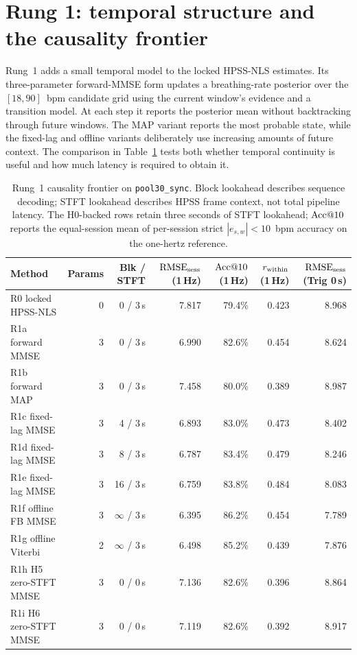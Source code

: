 \section{Rung 1: temporal structure and the causality frontier}
\label{sec:ch4_rung1}

Rung~1 adds a small temporal model to the locked HPSS-NLS estimates. Its three-parameter
forward-MMSE form updates a breathing-rate posterior over the $[18,90]$~bpm candidate grid using the current
window's evidence and a transition model. At each step it reports the posterior mean without
backtracking through future windows. The MAP variant reports the most probable state, while the
fixed-lag and offline variants deliberately use increasing amounts of future context. The
comparison in Table~\ref{tab:ch4_rung1} tests both whether temporal continuity is useful and how
much latency is required to obtain it.

\begin{table}[htbp]
  \centering
  \footnotesize
  \setlength{\tabcolsep}{4pt}
  \caption{Rung~1 causality frontier on \texttt{pool30\_sync}. Block lookahead describes sequence
  decoding; STFT lookahead describes HPSS frame context, not total pipeline latency. The H0-backed
  rows retain three seconds of STFT lookahead; $\mathrm{Acc}@10$ reports the equal-session mean of
  per-session strict $|e_{s,w}|<10$~bpm accuracy on the one-hertz reference.}
  \label{tab:ch4_rung1}
  \begin{tabularx}{\textwidth}{@{}>{\raggedright\arraybackslash}Xrrrrrr@{}}
    \toprule
    Method & Params & Blk / STFT & $\mathrm{RMSE}_{\mathrm{sess}}$ (1\,Hz) & $\mathrm{Acc}@10$ (1\,Hz) & $r_{\mathrm{within}}$ (1\,Hz) & $\mathrm{RMSE}_{\mathrm{sess}}$ (Trig 0\,s) \\
    \midrule
    R0 locked HPSS-NLS & 0 & 0 / 3\,s & 7.817 & 79.4\% & 0.423 & 8.968 \\
    R1a forward MMSE & 3 & 0 / 3\,s & 6.990 & 82.6\% & 0.454 & 8.624 \\
    R1b forward MAP & 3 & 0 / 3\,s & 7.458 & 80.0\% & 0.389 & 8.987 \\
    R1c fixed-lag MMSE & 3 & 4 / 3\,s & 6.893 & 83.0\% & 0.473 & 8.402 \\
    R1d fixed-lag MMSE & 3 & 8 / 3\,s & 6.787 & 83.4\% & 0.479 & 8.246 \\
    R1e fixed-lag MMSE & 3 & 16 / 3\,s & 6.759 & 83.8\% & 0.484 & 8.083 \\
    R1f offline FB MMSE & 3 & $\infty$ / 3\,s & 6.395 & 86.2\% & 0.454 & 7.789 \\
    R1g offline Viterbi & 2 & $\infty$ / 3\,s & 6.498 & 85.2\% & 0.439 & 7.876 \\
    R1h H5 zero-STFT MMSE & 3 & 0 / 0\,s & 7.136 & 82.6\% & 0.396 & 8.864 \\
    R1i H6 zero-STFT MMSE & 3 & 0 / 0\,s & 7.119 & 82.6\% & 0.392 & 8.917 \\
    \bottomrule
  \end{tabularx}
\end{table}

